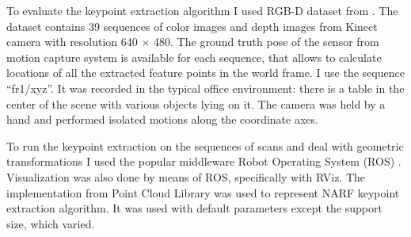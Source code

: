 To evaluate the keypoint extraction algorithm I used RGB-D dataset from \cite{endres2012evaluation}. The dataset contains 39 sequences of color images and depth images from Kinect camera with resolution 640 $\times$ 480. The ground truth pose of the sensor from motion capture system is available for each sequence, that allows to calculate locations of all the extracted feature points in the world frame. I use the sequence ``fr1/xyz''. It was recorded in the typical office environment: there is a table in the center of the scene with various objects lying on it. The camera was held by a hand and performed isolated motions along the coordinate axes.

To run the keypoint extraction on the sequences of scans and deal with geometric transformations I used the popular middleware Robot Operating System (ROS) \cite{ROS2009}. Visualization was also done by means of ROS, specifically with RViz. The implementation from Point Cloud Library \cite{rusu20113d} was used to represent NARF keypoint extraction algorithm. It was used  with default parameters except the support size, which varied.